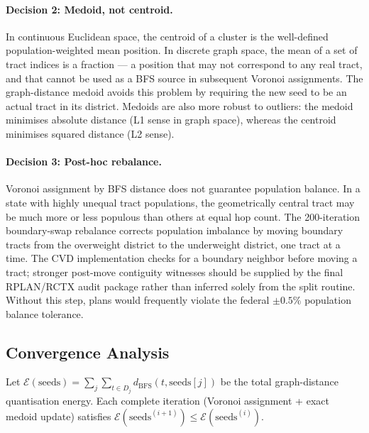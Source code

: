 \paragraph{Decision 2: Medoid, not centroid.}
In continuous Euclidean space, the centroid of a cluster is the well-defined
population-weighted mean position.
In discrete graph space, the mean of a set of tract indices is a fraction
--- a position that may not correspond to any real tract, and that cannot
be used as a BFS source in subsequent Voronoi assignments.
The graph-distance medoid avoids this problem by requiring the new seed to be
an actual tract in its district.
Medoids are also more robust to outliers: the medoid minimises absolute
distance (L1 sense in graph space), whereas the centroid minimises squared
distance (L2 sense).

\paragraph{Decision 3: Post-hoc rebalance.}
Voronoi assignment by BFS distance does not guarantee population balance.
In a state with highly unequal tract populations, the geometrically central
tract may be much more or less populous than others at equal hop count.
The 200-iteration boundary-swap rebalance corrects population imbalance by
moving boundary tracts from the overweight district to the underweight
district, one tract at a time.
The CVD implementation checks for a boundary neighbor before moving a tract;
stronger post-move contiguity witnesses should be supplied by the final
RPLAN/RCTX audit package rather than inferred solely from the split routine.
Without this step, \cvd{} plans would frequently violate the federal
$\pm 0.5\%$ population balance tolerance.

\subsection{Convergence Analysis}

\begin{proposition}
\label{prop:convergence}
Let $\mathcal{E}(\mathrm{seeds}) = \sum_{j} \sum_{t \in D_j} d_{\mathrm{BFS}}(t, \mathrm{seeds}[j])$
be the total graph-distance quantisation energy.
Each complete iteration (Voronoi assignment + exact medoid update) satisfies
$\mathcal{E}(\mathrm{seeds}^{(i+1)}) \le \mathcal{E}(\mathrm{seeds}^{(i)})$.
\end{proposition}

